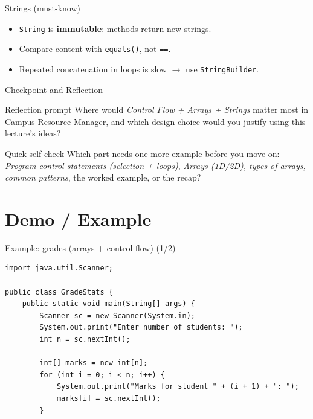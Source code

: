 \documentclass{beamer}
\begin{document}
\begin{frame}{Strings (must-know)}
  \begin{itemize}[<+->]
    \item \texttt{String} is \textbf{immutable}: methods return new strings.
    \item Compare content with \texttt{equals()}, not \texttt{==}.
    \item Repeated concatenation in loops is slow $\rightarrow$ use \texttt{StringBuilder}.
  \end{itemize}
  \slidesources{\OOPSUnitISources}
\end{frame}

\begin{frame}{Checkpoint and Reflection}
\begin{block}{Reflection prompt}
Where would \textit{Control Flow + Arrays + Strings} matter most in Campus Resource Manager, and which design choice would you justify using this lecture's ideas?
\end{block}
\begin{block}{Quick self-check}
Which part needs one more example before you move on: \textit{Program control statements (selection + loops)}, \textit{Arrays (1D/2D), types of arrays, common patterns}, the worked example, or the recap?
\end{block}
  \slidesources{\OOPSUnitISources}
\end{frame}

\section{Demo / Example}
\label{sec:demo}

\begin{frame}[fragile,shrink=8]{Example: grades (arrays + control flow) (1/2)}
\begin{lstlisting}
import java.util.Scanner;

public class GradeStats {
    public static void main(String[] args) {
        Scanner sc = new Scanner(System.in);
        System.out.print("Enter number of students: ");
        int n = sc.nextInt();

        int[] marks = new int[n];
        for (int i = 0; i < n; i++) {
            System.out.print("Marks for student " + (i + 1) + ": ");
            marks[i] = sc.nextInt();
        }
\end{lstlisting}
  \slidesources{\OOPSUnitISources}
\end{frame}
\end{document}
